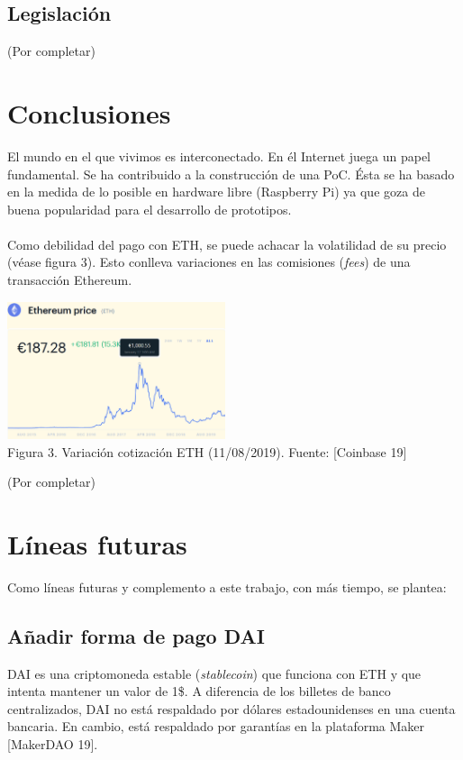\documentclass[9pt,oneside]{amsart}
\begin{document}
\begin{multicols}{2}
\subsection{Legislación} \label{ch:legislation}
(Por completar)
\section{Conclusiones}\label{sec:conclusions}
El mundo en el que vivimos es interconectado. En él Internet juega un papel fundamental. Se ha contribuido a la construcción de una PoC. Ésta se ha basado en la medida de lo posible en hardware libre (Raspberry Pi) ya que goza de buena popularidad para el desarrollo de prototipos.
\\
\\
Como debilidad del pago con ETH, se puede achacar la volatilidad de su precio (véase figura 3). Esto conlleva variaciones en las comisiones (\textit{fees}) de una transacción Ethereum.
\begin{center}
  \includegraphics[keepaspectratio, width=0.481125\textwidth]{images/ethcurrentprice-sourcecoinbase.eps}
\\
Figura 3. Variación cotización ETH (11/08/2019). Fuente: [Coinbase 19]
\\
\end{center}
(Por completar)
\section{Líneas futuras}\label{sec:future}
Como líneas futuras y complemento a este trabajo, con más tiempo, se plantea:
\subsection{Añadir forma de pago DAI} \label{ch:dai}
DAI es una criptomoneda estable (\textit{stablecoin}) que funciona con ETH y que intenta mantener un valor de 1\$. A diferencia de los billetes de banco centralizados, DAI no está respaldado por dólares estadounidenses en una cuenta bancaria. En cambio, está respaldado por garantías en la plataforma Maker [MakerDAO 19].

\end{multicols}
\end{document}
